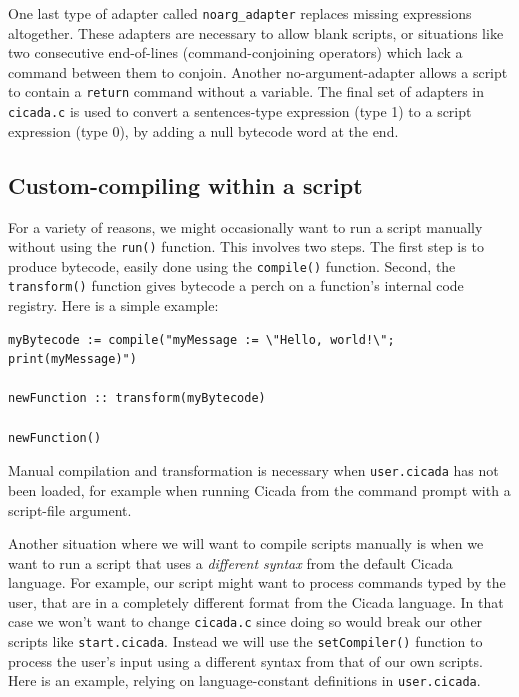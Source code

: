 \documentclass{article}
\newenvironment{code}{
       \begin{list}{}{
               \setlength{\leftmargin}{.4in}
               \setlength{\rightmargin}{0in}
               \setlength{\topsep}{.2in}
       }
       \small
       \item[] }
       { \end{list}   }
\begin{document}
One last type of adapter called \verb#noarg_adapter# replaces missing expressions altogether.  These adapters are necessary to allow blank scripts, or situations like two consecutive end-of-lines (command-conjoining operators) which lack a command between them to conjoin.  Another no-argument-adapter allows a script to contain a \verb#return# command without a variable.  The final set of adapters in \verb#cicada.c# is used to convert a sentences-type expression (type 1) to a script expression (type 0), by adding a null bytecode word at the end.\\


 



\subsection{Custom-compiling within a script}

For a variety of reasons, we might occasionally want to run a script manually without using the \verb#run()# function.  This involves two steps.  The first step is to produce bytecode, easily done using the \verb#compile()# function.  Second, the \verb#transform()# function gives bytecode a perch on a function's internal code registry.  Here is a simple example:

\begin{code} \begin{verbatim}
myBytecode := compile("myMessage := \"Hello, world!\"; print(myMessage)")

newFunction :: transform(myBytecode)

newFunction()
\end{verbatim} \end{code}

\noindent Manual compilation and transformation is necessary when \verb#user.cicada# has not been loaded, for example when running Cicada from the command prompt with a script-file argument.

Another situation where we will want to compile scripts manually is when we want to run a script that uses a \emph{different syntax} from the default Cicada language.  For example, our script might want to process commands typed by the user, that are in a completely different format from the Cicada language.  In that case we won't want to change \verb#cicada.c# since doing so would break our other scripts like \verb#start.cicada#.  Instead we will use the \verb#setCompiler()# function to process the user's input using a different syntax from that of our own scripts.  Here is an example, relying on language-constant definitions in \verb#user.cicada#.
\end{document}
